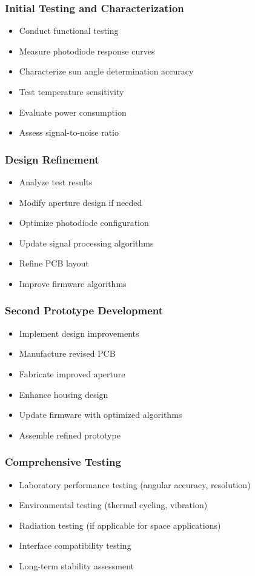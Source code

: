 \subsubsection*{Initial Testing and Characterization}
\begin{itemize}
  \item Conduct functional testing
  \item Measure photodiode response curves
  \item Characterize sun angle determination accuracy
  \item Test temperature sensitivity
  \item Evaluate power consumption
  \item Assess signal-to-noise ratio
\end{itemize}

\subsubsection*{Design Refinement}
\begin{itemize}
  \item Analyze test results
  \item Modify aperture design if needed
  \item Optimize photodiode configuration
  \item Update signal processing algorithms
  \item Refine PCB layout
  \item Improve firmware algorithms
\end{itemize}

\subsubsection*{Second Prototype Development}
\begin{itemize}
  \item Implement design improvements
  \item Manufacture revised PCB
  \item Fabricate improved aperture
  \item Enhance housing design
  \item Update firmware with optimized algorithms
  \item Assemble refined prototype
\end{itemize}

\subsubsection*{Comprehensive Testing}
\begin{itemize}
  \item Laboratory performance testing (angular accuracy, resolution)
  \item Environmental testing (thermal cycling, vibration)
  \item Radiation testing (if applicable for space applications)
  \item Interface compatibility testing
  \item Long-term stability assessment
\end{itemize}

